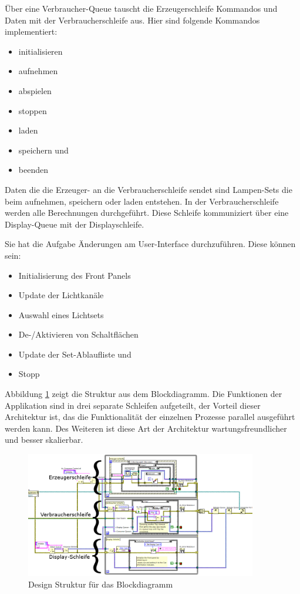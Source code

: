 Über eine Verbraucher-Queue tauscht die Erzeugerschleife Kommandos und Daten mit der Verbraucherschleife aus. Hier sind folgende Kommandos implementiert:
\begin{itemize}
\item initialisieren
\item aufnehmen
\item abspielen
\item stoppen
\item laden
\item speichern und
\item beenden
\end{itemize}
Daten die die Erzeuger- an die Verbraucherschleife sendet sind Lampen-Sets die beim aufnehmen, speichern oder laden entstehen. In der Verbraucherschleife werden alle Berechnungen durchgeführt. Diese Schleife kommuniziert über eine Display-Queue mit der Displayschleife.

Sie hat die Aufgabe Änderungen am User-Interface durchzuführen. Diese können sein:
\begin{itemize}
\item Initialisierung des Front Panels
\item Update der Lichtkanäle
\item Auswahl eines Lichtsets
\item De-/Aktivieren von Schaltflächen
\item Update der Set-Ablaufliste und
\item Stopp
\end{itemize}

Abbildung \ref{fig:schleifen} zeigt die Struktur aus dem Blockdiagramm. 
Die Funktionen der Applikation sind in drei separate Schleifen aufgeteilt, der Vorteil dieser Architektur ist, das die Funktionalität der einzelnen Prozesse parallel ausgeführt werden kann. Des Weiteren ist diese Art der Architektur wartungsfreundlicher und besser skalierbar. 


	\begin{figure}%
	\centering
		\includegraphics[width=0.9\textwidth]{Pics/ueberblick003.png}
	\caption{Design Struktur für das Blockdiagramm}
	\label{fig:schleifen}
	\end{figure}
 		

